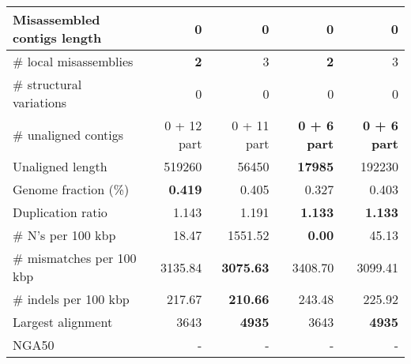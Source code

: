 \documentclass[12pt,a4paper]{article}
\begin{document}
\begin{table}[ht]
\begin{center}
\begin{tabular}{|l*{4}{|r}|}
Misassembled contigs length & 0 & 0 & 0 & 0 \\ \hline
\# local misassemblies & {\bf 2} & 3 & {\bf 2} & 3 \\ \hline
\# structural variations & 0 & 0 & 0 & 0 \\ \hline
\# unaligned contigs & 0 + 12 part & 0 + 11 part & {\bf 0 + 6 part} & {\bf 0 + 6 part} \\ \hline
Unaligned length & 519260 & 56450 & {\bf 17985} & 192230 \\ \hline
Genome fraction (\%) & {\bf 0.419} & 0.405 & 0.327 & 0.403 \\ \hline
Duplication ratio & 1.143 & 1.191 & {\bf 1.133} & {\bf 1.133} \\ \hline
\# N's per 100 kbp & 18.47 & 1551.52 & {\bf 0.00} & 45.13 \\ \hline
\# mismatches per 100 kbp & 3135.84 & {\bf 3075.63} & 3408.70 & 3099.41 \\ \hline
\# indels per 100 kbp & 217.67 & {\bf 210.66} & 243.48 & 225.92 \\ \hline
Largest alignment & 3643 & {\bf 4935} & 3643 & {\bf 4935} \\ \hline
NGA50 & - & - & - & - \\ \hline
\end{tabular}
\end{center}
\end{table}
\end{document}
